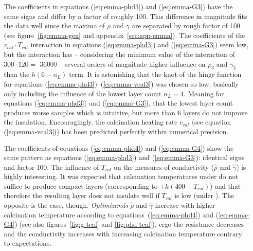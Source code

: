 The coefficients in equations (\ref{eq:emma-phd3}) and (\ref{eq:emma-G3}) have the same signs and differ by a factor of roughly 100.
This difference in magnitude fits the data well since the maxima of $\rho$ and $\gamma$ are separated by rough factor of 100 (see figure~\ref{fig:emma-gen} and appendix~\ref{sec:app-emma}). %
The coefficients of the $v_{cal} \cdot T_{cal}$ interaction in equations (\ref{eq:emma-phd3}) and (\ref{eq:emma-G3}) 
seem low, but the interaction has -- considering the minimum value of the interaction of $300 \cdot 120 =$  \num{36000} -- several orders of magnitude higher influence on $\rho_3$ and $\gamma_3$ than the $h(6-n_L)$ term. 
It is astonishing that the knot of the hinge function for equations (\ref{eq:emma-phd3})--(\ref{eq:emma-vcal3}) was chosen so low; 
basically only including the influence of the lowest layer count $n_L=4$.
Meaning for equations (\ref{eq:emma-phd3}) and (\ref{eq:emma-G3}), that the lowest layer count produces worse samples which is intuitive, but more than 6 layers do not improve the insulation. 
Encouragingly, the calcination heating rate $v_{cal}$ (see equation (\ref{eq:emma-vcal3})) has been predicted perfectly within numerical precision. 

The coefficients of equations (\ref{eq:emma-phd4}) and (\ref{eq:emma-G4}) show the same pattern 
as equations (\ref{eq:emma-phd3}) and (\ref{eq:emma-G3}): identical signs and factor 100. 
%
The influence of $T_{cal}$ on the measures of conductivity ($\hat\rho$ and $\hat\gamma$) is highly interesting. 
It was expected that 
calcination temperatures under  do not suffice to produce compact layers (corresponding to $+h(400-T_{cal})$)
and 
that therefore the resulting layer does not insulate well if $T_{cal}$ is low (under ). 
The opposite is the case, though. %
\textit{Optimizands} $\hat\rho$ and $\hat{\gamma}$ increase with higher calcination temperature 
according to equations~(\ref{eq:emma-phd4}) and (\ref{eq:emma-G4}) (see also figures~\ref{fig:g-tcal} and \ref{fig:phd-tcal}), 
ergo the resistance decreases and the conductivity increases with increasing calcination temperature contrary to expectations.


